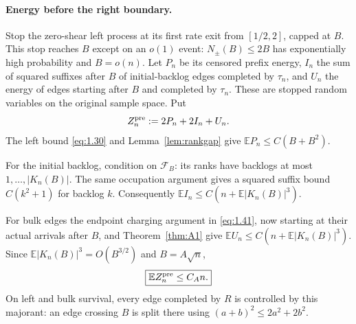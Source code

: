 \documentclass[11pt,reqno]{amsart}
\theoremstyle{definition}
\theoremstyle{remark}
\numberwithin{equation}{section}
\newcommand{\E}{\mathbb E}
\begin{document}
\paragraph{Energy before the right boundary.}
Stop the zero-shear left process at its first rate exit from \([1/2,2]\),
capped at \(B\).  This stop reaches \(B\) except on an \(o(1)\) event:
\(N_\pm(B)\le2B\) has exponentially high probability and \(B=o(n)\).
Let \(P_n\) be its censored prefix energy, \(I_n\) the sum of squared
suffixes after \(B\) of initial-backlog edges completed by \(\tau_n\), and
\(U_n\) the energy of edges starting after \(B\) and completed by \(\tau_n\).
These are stopped random variables on the original sample space.  Put
\begin{equation}
Z_n^{\rm pre}:=2P_n+2I_n+U_n.
\label{eq:1.41a}
\end{equation}
The left bound \eqref{eq:1.30} and Lemma~\ref{lem:rankgap} give
\(\E P_n\le C(B+B^2)\).

For the initial backlog, condition on
\(\mathcal F_B\): its ranks have backlogs at most
\(1,\ldots,|K_n(B)|\).  The same occupation argument gives a squared
suffix bound \(C(k^2+1)\) for backlog \(k\).  Consequently
\(\E I_n\le C(n+\E|K_n(B)|^3)\).

For bulk edges the endpoint charging
argument in \eqref{eq:1.41}, now starting at their actual arrivals after \(B\),
and Theorem~\ref{thm:A1} give \(\E U_n\le C(n+\E|K_n(B)|^3)\).  Since
\(\E|K_n(B)|^3=O(B^{3/2})\) and \(B=A\sqrt n\),
\begin{equation}
\boxed{\E Z_n^{\rm pre}\le C_A n.}
\label{eq:1.41b}
\end{equation}
On left and bulk survival, every edge completed by \(R\) is controlled
by this majorant: an edge crossing \(B\) is split there using
\((a+b)^2\le2a^2+2b^2\).
\end{document}
